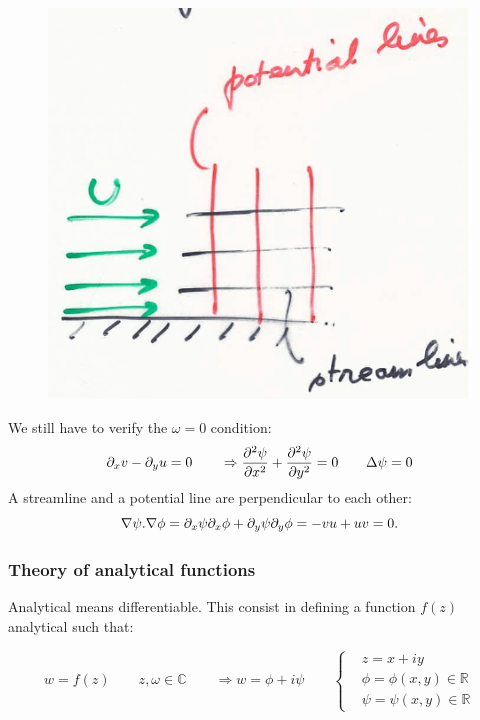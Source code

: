  		\begin{figure}
		\vspace{-5mm}
		\includegraphics[scale=0.2]{ch2/24}
		\label{fig:2.23}
		\end{figure}
		We still have to verify the $\omega=0$ condition:
 		\begin{equation}
 		\partial _x v - \partial _y u = 0 \qquad \Rightarrow \frac{\partial ^2 \psi}{\partial x^2} + \frac{\partial ^2 \psi}{\partial y^2} = 0 \qquad \Delta \psi = 0
 		\end{equation}
 		A streamline and a potential line are perpendicular to each other:
 		\begin{equation}
 		\nabla \psi . \nabla \phi = \partial _x \psi \partial _x \phi + \partial_ y \psi \partial _y \phi = -vu + uv = 0. 
 		\end{equation}
 		
 		
 	\subsubsection{Theory of analytical functions}
 		Analytical means differentiable. This consist in defining a function $f(z)$ analytical such that:
 		
 		\begin{equation}
 		 w = f(z) \qquad z,\omega \in \mathbb{C} \qquad \Rightarrow w = \phi +i \psi \qquad \left\{
 		 \begin{aligned}
			&z= x+iy\\ 		 
			&\phi = \phi (x,y) \in \mathbb{R}\\
			&\psi =  \psi(x,y) \in \mathbb{R}
\end{aligned} 		  
 		 \right.
 		\end{equation}
 		
